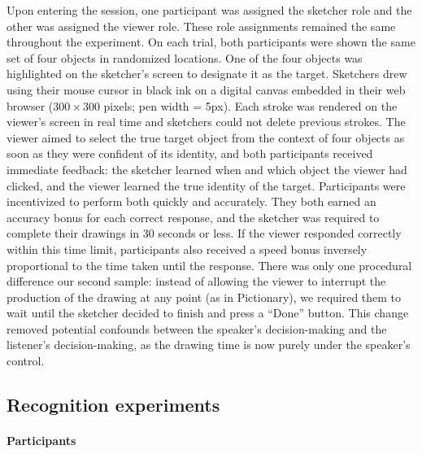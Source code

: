 \documentclass[11pt,letterpaper]{article}
\begin{document}
Upon entering the session, one participant was assigned the sketcher role and the other was assigned the viewer role. 
These role assignments remained the same throughout the experiment.
On each trial, both participants were shown the same set of four objects in randomized locations.
One of the four objects was highlighted on the sketcher's screen to designate it as the target.
Sketchers drew using their mouse cursor in black ink on a digital canvas embedded in their web browser ($300 \times 300$ pixels; pen width = 5px).
Each stroke was rendered on the viewer's screen in real time and sketchers could not delete previous strokes.
The viewer aimed to select the true target object from the context of four objects as soon as they were confident of its identity, and both participants received immediate feedback: the sketcher learned when and which object the viewer had clicked, and the viewer learned the true identity of the target.
Participants were incentivized to perform both quickly and accurately.
They both earned an accuracy bonus for each correct response, and the sketcher was required to complete their drawings in 30 seconds or less.
If the viewer responded correctly within this time limit, participants also received a speed bonus inversely proportional to the time taken until the response.
There was only one procedural difference our second sample: instead of allowing the viewer to interrupt the production of the drawing at any point (as in Pictionary), we required them to wait until the sketcher decided to finish and press a ``Done'' button.
This change removed potential confounds between the speaker's decision-making and the listener's decision-making, as the drawing time is now purely under the speaker's control.

\subsection{Recognition experiments}

\paragraph{Participants}

\end{document}
